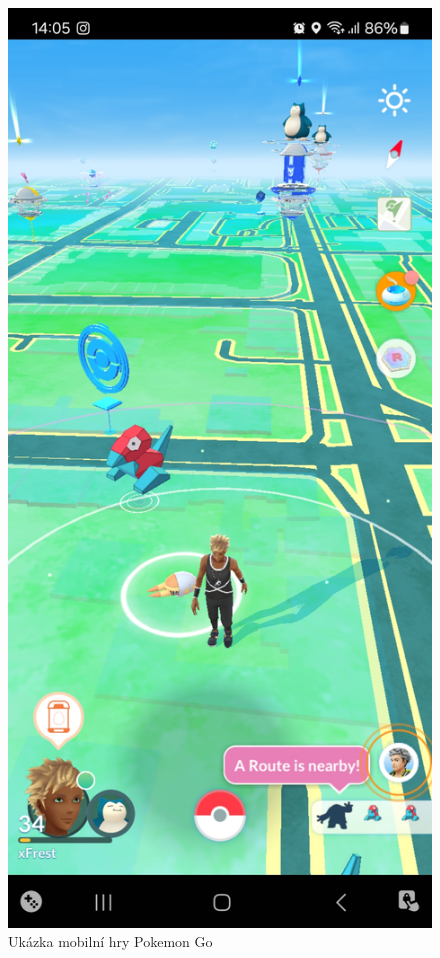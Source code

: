 \begin{figure}[H]
	\centering
	\includegraphics[scale=0.09]{obrazky-figures/PokemonGo.jpg}
	\caption{Ukázka mobilní hry Pokemon Go}
	\label{fig:pogo}
\end{figure}

